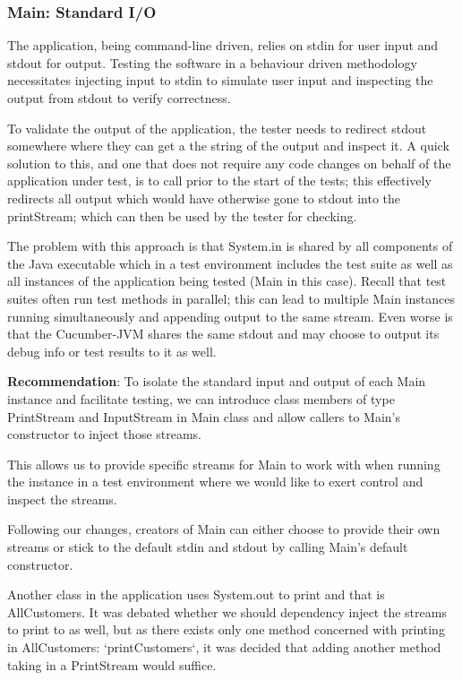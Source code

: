 \subsubsection{Main: Standard I/O}
\label{sec:main-stdio}
The application, being command-line driven, relies on stdin for user input and stdout for output. Testing the software in a behaviour driven methodology necessitates injecting input to stdin to simulate user input and inspecting the output from stdout to verify correctness. 
\par
To validate the output of the application, the tester needs to redirect stdout somewhere where they can get a the string of the output and inspect it. A quick solution to this, and one that does not require any code changes on behalf of the application under test, is to call  prior to the start of the tests; this effectively redirects all output which would have otherwise gone to stdout into the printStream; which can then be used by the tester for checking. 
\par
The problem with this approach is that System.in is shared by all components of the Java executable which in a test environment includes the test suite as well as all instances of the application being tested (Main in this case). Recall that test suites often run test methods in parallel; this can lead to multiple Main instances running simultaneously and appending output to the same stream. Even worse is that the Cucumber-JVM shares the same stdout and may choose to output its debug info or test results to it as well. 
\par 
\textbf{Recommendation}: To isolate the standard input and output of each Main instance and facilitate testing, we can introduce class members of type PrintStream and InputStream in Main class and allow callers to Main's constructor to inject those streams.
\par
This allows us to provide specific streams for Main to work with when running the instance in a test environment where we would like to exert control and inspect the streams. 
\par 
Following our changes, creators of Main can either choose to provide their own streams or stick to the default stdin and stdout by calling Main's default constructor. 
\par
Another class in the application uses System.out to print and that is AllCustomers. It was debated whether we should dependency inject the streams to print to as well, but as there exists only one method concerned with printing in AllCustomers: `printCustomers`, it was decided that adding another  method taking in a PrintStream would suffice.
